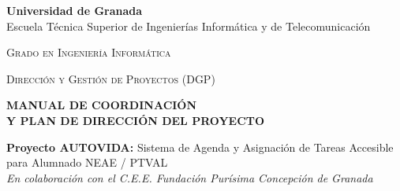 \hypersetup{pageanchor=false}
\begin{titlepage}
  \AddToShipoutPicture*{\BackgroundPic}
  
  \begin{flushleft}
    \large\textsf{\textbf{Universidad de Granada}}\\[2pt]
    \large\textsf{Escuela Técnica Superior de Ingenierías Informática y de Telecomunicación}
    \vfill

    {\large\textsc{Grado en Ingeniería Informática}} 
    \vfill

    {\large\textsc{Dirección y Gestión de Proyectos (DGP)}}
    \par{}
    \vfill

    \begin{flushleft}
      \Huge\bfseries\color{ugrDarkRed}
      MANUAL DE COORDINACIÓN\\
      \LARGE\color{textDark}
      Y PLAN DE DIRECCIÓN DEL PROYECTO
    \end{flushleft}
    \vspace{6pt}
    {\large\textsf{\textbf{Proyecto AUTOVIDA:}} Sistema de Agenda y Asignación de Tareas Accesible para Alumnado NEAE / PTVAL}\\[4pt]
    {\normalsize\itshape En colaboración con el C.E.E. Fundación Purísima Concepción de Granada}

    \vfill
    

\end{flushleft}
\end{titlepage}
